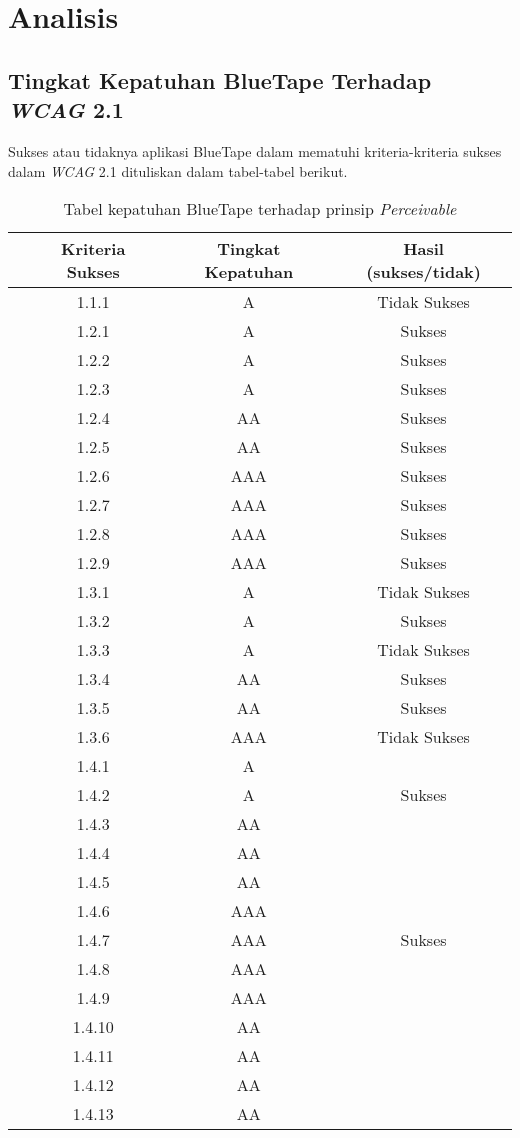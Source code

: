 \chapter{Analisis}
\label{chap:analisis}

\section{Tingkat Kepatuhan BlueTape Terhadap \textit{WCAG} 2.1}
Sukses atau tidaknya aplikasi BlueTape dalam mematuhi kriteria-kriteria sukses dalam \textit{WCAG} 2.1 dituliskan dalam tabel-tabel berikut.
\label{sec:kepatuhan_bluetape_terhadap_wcag_2.1}
\begin{table}[H]
    \centering 
    \caption{Tabel kepatuhan BlueTape terhadap prinsip \textit{Perceivable}}
    \label{tab:kepatuhan_bluetape_perceivable}
    \begin{tabular}{cccc}
        \toprule
        & Kriteria Sukses & Tingkat Kepatuhan & Hasil (sukses/tidak)\\

        \midrule
        & 1.1.1 & A & Tidak Sukses \\
        & 1.2.1 & A & Sukses \\
        & 1.2.2 & A & Sukses \\
        & 1.2.3 & A & Sukses \\
        & 1.2.4 & AA & Sukses \\
        & 1.2.5 & AA & Sukses \\
        & 1.2.6 & AAA & Sukses \\
        & 1.2.7 & AAA & Sukses \\
        & 1.2.8 & AAA & Sukses \\
        & 1.2.9 & AAA & Sukses \\
        & 1.3.1 & A & Tidak Sukses \\
        & 1.3.2 & A & Sukses \\
        & 1.3.3 & A & Tidak Sukses \\
        & 1.3.4 & AA & Sukses \\
        & 1.3.5 & AA & Sukses \\
        & 1.3.6 & AAA & Tidak Sukses \\
        & 1.4.1 & A & \\
        & 1.4.2 & A & Sukses \\
        & 1.4.3 & AA & \\
        & 1.4.4 & AA & \\
        & 1.4.5 & AA & \\
        & 1.4.6 & AAA & \\
        & 1.4.7 & AAA & Sukses \\
        & 1.4.8 & AAA & \\
        & 1.4.9 & AAA & \\
        & 1.4.10 & AA & \\
        & 1.4.11 & AA & \\
        & 1.4.12 & AA & \\
        & 1.4.13 & AA & \\
        
        \bottomrule

    \end{tabular}
\end{table}
